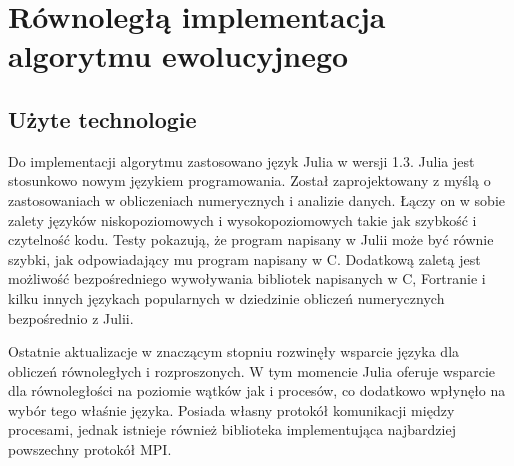 \chapter{Równoległą implementacja algorytmu ewolucyjnego}
\thispagestyle{chapterBeginStyle}

\section{Użyte technologie}
Do implementacji algorytmu zastosowano język Julia\cite{JULIA-PUB} w wersji 1.3. Julia jest stosunkowo nowym językiem programowania. Został zaprojektowany 
z myślą o zastosowaniach w obliczeniach numerycznych i analizie danych. Łączy on w sobie zalety języków niskopoziomowych i wysokopoziomowych takie jak szybkość 
i czytelność kodu. Testy pokazują, że program napisany w Julii może być równie szybki, jak odpowiadający mu program napisany w C\cite{JULIA-PERFORMANCE}. 
Dodatkową zaletą jest możliwość bezpośredniego wywoływania bibliotek napisanych w C, Fortranie i kilku innych językach popularnych w dziedzinie 
obliczeń numerycznych bezpośrednio z Julii.

Ostatnie aktualizacje w znaczącym stopniu rozwinęły wsparcie języka dla obliczeń równoległych i rozproszonych. W tym momencie Julia oferuje wsparcie dla 
równoległości na poziomie wątków jak i procesów, co dodatkowo wpłynęło na wybór tego właśnie języka. Posiada własny protokół komunikacji między procesami, jednak 
istnieje również biblioteka implementująca najbardziej powszechny protokół MPI.

